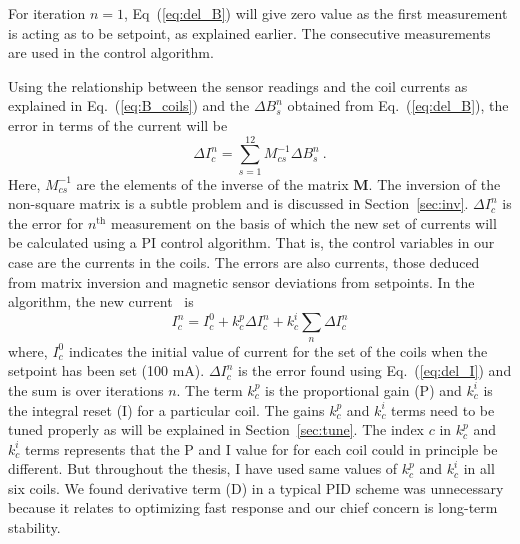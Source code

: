 For iteration $n=1$, Eq~(\ref{eq:del_B}) will give zero value as the first measurement is acting as to be setpoint, as explained earlier. The consecutive measurements are used in the control algorithm. 

Using the relationship between the sensor readings and the coil currents as explained in Eq.~(\ref{eq:B_coils}) and the $\Delta B_s^n$ obtained from Eq.~(\ref{eq:del_B}), the error in terms of the current  will be
\begin{equation}\label{eq:del_I}
    \Delta I_c^n =\sum_{s=1}^{12} M^{-1}_{cs} \Delta B_s^n~\text{.}
\end{equation}
Here, $M^{-1}_{cs}$ are the elements of the inverse of the matrix $\bm{M}$. The inversion of the non-square matrix is a subtle problem and is discussed in Section~\ref{sec:inv}. $\Delta I_c^n$ is the error for $n^{\mathrm{th}}$ measurement on the basis of which the new set of currents will be calculated using a PI control algorithm. That is, the control variables in our case are the currents in the coils. The errors are also currents, those deduced from matrix inversion and magnetic sensor deviations from setpoints. In the algorithm, the new current~\cite{bea} is
\begin{equation}\label{eq:I}
    I^n_c=I^0_c+k^p_c \Delta I_c^n+k^i_c\sum_n \Delta I_c^n
\end{equation}
where, $I^0_c$ indicates the initial value of current for the set of the coils when the setpoint has been set (100 mA). $\Delta I_c^n$ is the error found using Eq.~(\ref{eq:del_I}) and the sum is over iterations $n$. The term $k^p_c$ is the proportional gain (P) and $k^i_c$ is the integral reset (I) for a particular coil. The gains $k^p_c$ and $k^i_c$ terms need to be tuned properly as will be explained in Section~\ref{sec:tune}. The index $c$ in $k^p_c$ and $k^i_c$ terms represents that the P and I value for for each coil could in principle be different. But throughout the thesis, I have used same values of $k_c^p$ and $k_c^i$ in all six coils. We found derivative term (D) in a typical PID scheme was unnecessary because it relates to optimizing fast response and our chief concern is long-term stability.


